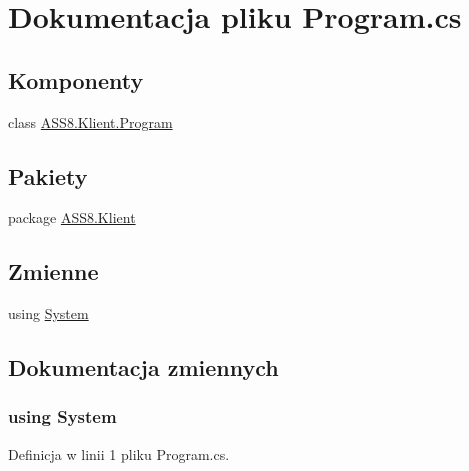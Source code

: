 \hypertarget{a00050}{
\section{Dokumentacja pliku Program.cs}
\label{d5/de0/a00050}
}
\subsection*{Komponenty}
\begin{CompactItemize}
\item 
class \hyperlink{a00021}{ASS8.Klient.Program}
\end{CompactItemize}
\subsection*{Pakiety}
\begin{CompactItemize}
\item 
package \hyperlink{a00060}{ASS8.Klient}
\end{CompactItemize}
\subsection*{Zmienne}
\begin{CompactItemize}
\item 
﻿using \hyperlink{a00050_81a223a02c34d82b47199f08308847f2}{System}
\end{CompactItemize}


\subsection{Dokumentacja zmiennych}
\hypertarget{a00050_81a223a02c34d82b47199f08308847f2}{
\subsubsection[{System}]{\setlength{\rightskip}{0pt plus 5cm}﻿using {\bf System}}}
\label{d5/de0/a00050_81a223a02c34d82b47199f08308847f2}




Definicja w linii 1 pliku Program.cs.